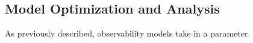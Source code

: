 \subsection{Model Optimization and Analysis}

As previously described, observability models take in a parameter

\subsubsection{}
